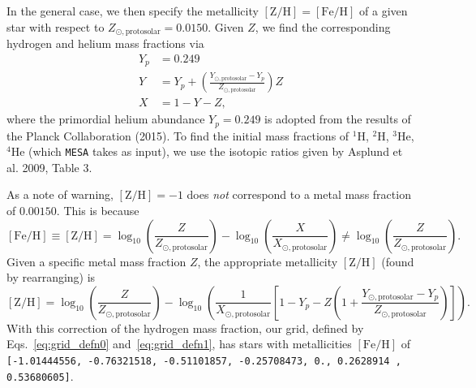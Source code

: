 \documentclass{article}
\begin{document}
In the general case, we then specify the metallicity $\mathrm{[Z/H]=[Fe/H]}$ of 
a given star with respect to $Z_{\odot,\mathrm{protosolar}} = 0.0150$. 
Given $Z$, we find the corresponding hydrogen and helium mass fractions via
\begin{align}
Y_p &= 0.249 
\label{eq:Planck_primordial_He}\\
Y &= Y_p + 
\left(\frac{Y_{\odot,\mathrm{protosolar}}-Y_p}{Z_{\odot,\mathrm{protosolar}}} 
\right) Z \\
X &= 1 - Y - Z,
\end{align}
where the primordial helium abundance $Y_p=0.249$ is adopted from the results 
of the Planck Collaboration (2015).
To find the initial mass fractions of $\mathrm{^1H}$, $\mathrm{^2H}$, 
$\mathrm{^3 He}$, $\mathrm{^4 He}$ (which \texttt{MESA} takes as input), we 
use the isotopic ratios given by Asplund et al. 2009, Table 3.

As a note of warning, $\mathrm{[Z/H]=-1}$ does \textit{not} correspond to a 
metal mass fraction of $0.00150$.
This is because 
\begin{equation}
\mathrm{[Fe/H]} \equiv \mathrm{[Z/H]} = \log_{10} 
\left(\frac{Z}{Z_{\odot,\mathrm{protosolar}}} \right)
-
\log_{10} \left(\frac{X}{X_{\odot,\mathrm{protosolar}}} \right)
\neq
\log_{10} \left(\frac{Z}{Z_{\odot,\mathrm{protosolar}}} \right).
\end{equation}
Given a specific metal mass fraction $Z$, the appropriate metallicity 
$\mathrm{[Z/H]}$ (found by rearranging) is 
\begin{equation}
\mathrm{[Z/H]} = \log_{10} \left(\frac{Z}{Z_{\odot,\mathrm{protosolar}}}\right) 
- \log_{10} \left(\frac{1}{X_{\odot,\mathrm{protosolar}}} \left[1-Y_p - 
Z\left(1 + \frac{Y_{\odot,\mathrm{protosolar}} - 
Y_p}{Z_{\odot,\mathrm{protosolar}}}\right)\right] \right).
\label{eq:metallicity_to_mass_frac}
\end{equation}
With this correction of the hydrogen mass fraction, our grid, defined by 
Eqs.~\ref{eq:grid_defn0} and~\ref{eq:grid_defn1}, has stars with metallicities 
$\mathrm{[Fe/H]}$
of \texttt{[-1.01444556, -0.76321518, -0.51101857, -0.25708473, 0., 0.2628914 
, 0.53680605]}.
\end{document}
